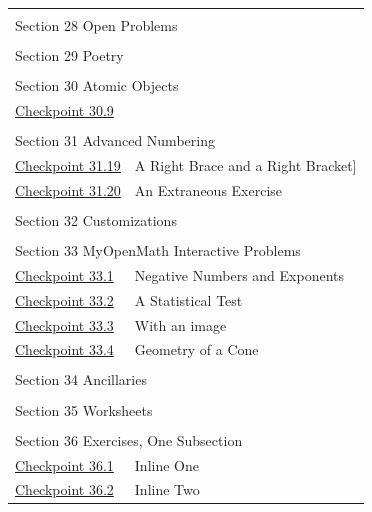 \documentclass[pdflatex]{sn-jnl}
\theoremstyle{thmstyleone}%
\theoremstyle{thmstyletwo}%
\theoremstyle{thmstylethree}%
\numberwithin{equation}{section}
\begin{document}
\begin{appendices}
\begin{longtable}[l]{ll}
\multicolumn{2}{l}{\null}\\[1.5ex] \multicolumn{2}{l}{\large Section 28 Open Problems}\\[0.5ex]
\multicolumn{2}{l}{\null}\\[1.5ex] \multicolumn{2}{l}{\large Section 29 Poetry}\\[0.5ex]
\multicolumn{2}{l}{\null}\\[1.5ex] \multicolumn{2}{l}{\large Section 30 Atomic Objects}\\[0.5ex]
\hyperref[atomic-image-25]{Checkpoint 30.9}& \\
\multicolumn{2}{l}{\null}\\[1.5ex] \multicolumn{2}{l}{\large Section 31 Advanced Numbering}\\[0.5ex]
\hyperref[exercise-difficult-title]{Checkpoint 31.19}& A Right Brace \textbraceright{} and a Right Bracket]\\
\hyperref[section-advanced-numbering-12-2]{Checkpoint 31.20}& An Extraneous Exercise\\
\multicolumn{2}{l}{\null}\\[1.5ex] \multicolumn{2}{l}{\large Section 32 Customizations}\\[0.5ex]
\multicolumn{2}{l}{\null}\\[1.5ex] \multicolumn{2}{l}{\large Section 33 MyOpenMath Interactive Problems}\\[0.5ex]
\hyperref[section-myopenmath-3]{Checkpoint 33.1}& Negative Numbers and Exponents\\
\hyperref[section-myopenmath-4]{Checkpoint 33.2}& A Statistical Test\\
\hyperref[section-myopenmath-5]{Checkpoint 33.3}& With an image\\
\hyperref[section-myopenmath-6]{Checkpoint 33.4}& Geometry of a Cone\\
\multicolumn{2}{l}{\null}\\[1.5ex] \multicolumn{2}{l}{\large Section 34 Ancillaries}\\[0.5ex]
\multicolumn{2}{l}{\null}\\[1.5ex] \multicolumn{2}{l}{\large Section 35 Worksheets}\\[0.5ex]
\multicolumn{2}{l}{\null}\\[1.5ex] \multicolumn{2}{l}{\large Section 36 Exercises, One Subsection}\\[0.5ex]
\hyperref[section-exercises-single-5]{Checkpoint 36.1}& Inline One\\
\hyperref[duplicate-inline]{Checkpoint 36.2}& Inline Two\\

\end{longtable}
\end{appendices}
\end{document}
